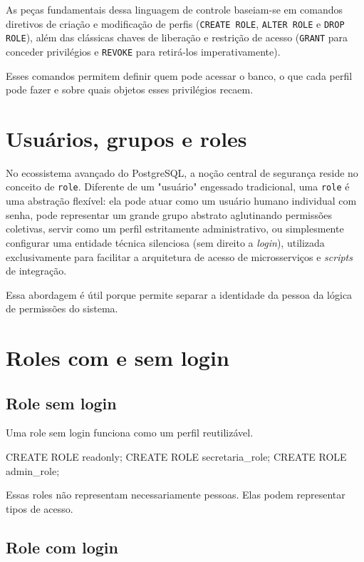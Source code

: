 As peças fundamentais dessa linguagem de controle baseiam-se em comandos diretivos de criação e modificação de perfis (\texttt{CREATE ROLE}, \texttt{ALTER ROLE} e \texttt{DROP ROLE}), além das clássicas chaves de liberação e restrição de acesso (\texttt{GRANT} para conceder privilégios e \texttt{REVOKE} para retirá-los imperativamente).

Esses comandos permitem definir quem pode acessar o banco, o que cada perfil pode fazer e sobre quais objetos esses privilégios recaem.

\section{Usuários, grupos e roles}

No ecossistema avançado do PostgreSQL, a noção central de segurança reside no conceito de \texttt{role}. Diferente de um "usuário" engessado tradicional, uma \texttt{role} é uma abstração flexível: ela pode atuar como um usuário humano individual com senha, pode representar um grande grupo abstrato aglutinando permissões coletivas, servir como um perfil estritamente administrativo, ou simplesmente configurar uma entidade técnica silenciosa (sem direito a \textit{login}), utilizada exclusivamente para facilitar a arquitetura de acesso de microsserviços e \textit{scripts} de integração.

Essa abordagem é útil porque permite separar a identidade da pessoa da lógica de permissões do sistema.

\section{Roles com e sem login}

\subsection{Role sem login}

Uma role sem login funciona como um perfil reutilizável.

\begin{sqlcode}
CREATE ROLE readonly;
CREATE ROLE secretaria_role;
CREATE ROLE admin_role;
\end{sqlcode}

Essas roles não representam necessariamente pessoas. Elas podem representar tipos de acesso.

\subsection{Role com login}

